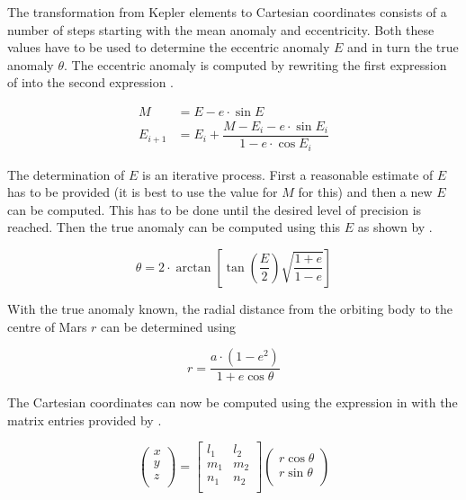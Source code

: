 The transformation from Kepler elements to Cartesian coordinates consists of a number of steps starting with the mean anomaly and eccentricity. Both these values have to be used to determine the eccentric anomaly $E$ and in turn the true anomaly $\theta$. The eccentric anomaly is computed by rewriting the first expression of  into the second expression \citep{noomen2013basic}. 



\begin{equation}\label{eq:mandecomp}
\begin{split}
 M&=E-e\cdot\sin{E}\\
 E_{i+1}&=E_{i}+\dfrac{M-E_{i}-e\cdot\sin{E_{i}}}{1-e\cdot\cos E_{i}}
\end{split}
\end{equation}


The determination of $E$ is an iterative process. First a reasonable estimate of $E$ has to be provided (it is best to use the value for $M$ for this) and then a new $E$ can be computed. This has to be done until the desired level of precision is reached. Then the true anomaly can be computed using this $E$ as shown by .

\begin{equation}\label{eq:etothetacomp}
\theta=2\cdot\arctan\left[\tan\left(\dfrac{E}{2}\right)\sqrt{\dfrac{1+e}{1-e}}\right]
\end{equation}

With the true anomaly known, the radial distance from the orbiting body to the centre of Mars $r$ can be determined using 

\begin{equation}\label{eq:radiuscomp}
r=\dfrac{a\cdot\left(1-e^{2}\right)}{1+e\cos\theta }
\end{equation}

The Cartesian coordinates can now be computed using the expression in  with the matrix entries provided by \citep{noomen2013basic}. 

\begin{equation}\label{eq:keptocartmat}
\begin{pmatrix}
x\\
y\\
z\\
\end{pmatrix}=
\begin{bmatrix}
l_{1} & l_{2}\\
m_{1} & m_{2}\\
n_{1} & n_{2}\\
\end{bmatrix}
\begin{pmatrix}
r\cos\theta \\
r\sin\theta \\
\end{pmatrix}
\end{equation}

